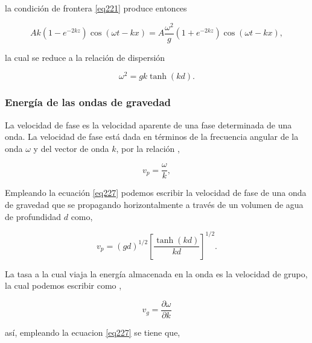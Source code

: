 \noindent la condición de frontera \ref{eq221} produce entonces

\begin{equation}\label{eq226}
   A k \left(1-e^{-2kz}\right)\cos(\omega t - k x) = A \frac{\omega^2}{g} \left(1+e^{-2kz}\right)\cos(\omega t - k x),
\end{equation}

\noindent la cual se reduce a la relación de dispersión 

\begin{equation}\label{eq227}
   \omega^2 = g k \tanh(k d).
\end{equation}


\subsubsection{Energía de las ondas de gravedad}

La velocidad de fase es la velocidad aparente de una fase determinada de una onda. La velocidad de fase está dada en términos de la frecuencia angular de la onda $\omega$ 
y del vector de onda $k$, por la relación \cite{Narayanan2015},

\begin{equation}\label{eq228}
   v_p = \frac{\omega}{k},
\end{equation}

\noindent Empleando la ecuación \ref{eq227} podemos escribir la velocidad de fase de una onda de gravedad que se propagando horizontalmente a través de un volumen de agua 
de profundidad $d$ como,

\begin{equation}\label{eq229}
   v_p = (gd)^{1/2} \left[\frac{\tanh(kd)}{kd}\right]^{1/2}.
\end{equation}

La tasa a la cual viaja la energía almacenada en la onda es la velocidad de grupo, la cual podemos escribir como \cite{Narayanan2015},

\begin{equation}\label{eq230}
   v_g = \frac{\partial \omega}{\partial k}
\end{equation}

\noindent así, empleando la ecuacion \ref{eq227} se tiene que, 

